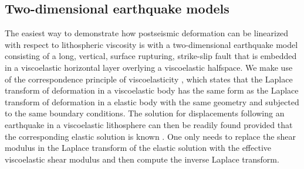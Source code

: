 \documentclass[extra,mreferee]{gji}
\begin{document}
\subsection{Two-dimensional earthquake models}
The easiest way to demonstrate how postseismic deformation can be
linearized with respect to lithospheric viscosity is with a
two-dimensional earthquake model consisting of a long, vertical,
surface rupturing, strike-slip fault that is embedded in a
viscoelastic horizontal layer overlying a viscoelastic halfspace.  We
make use of the correspondence principle of viscoelasticity
\citep[e.g.][]{F1975}, which states that the Laplace transform of
deformation in a viscoelastic body has the same form as the Laplace
transform of deformation in a elastic body with the same geometry and
subjected to the same boundary conditions. The solution for
displacements following an earthquake in a viscoelastic lithosphere
can then be readily found provided that the corresponding elastic
solution is known \citep[e.g.][]{NM1974,SP1978,HH2005}.  One only
needs to replace the shear modulus in the Laplace transform of the
elastic solution with the effective viscoelastic shear modulus and
then compute the inverse Laplace transform.
\end{document}
